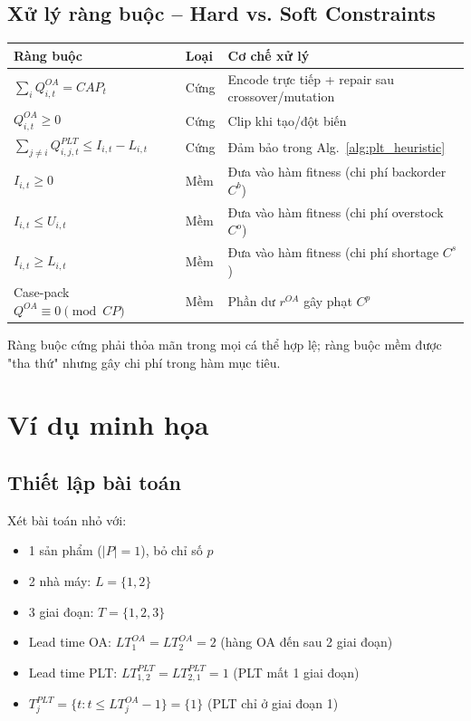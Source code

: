\documentclass[12pt]{article}
\newcommand{\QOA}{Q^{OA}}
\newcommand{\QPLT}{Q^{PLT}}
\begin{document}
\subsection{Xử lý ràng buộc -- Hard vs. Soft Constraints}

\begin{center}
\begin{tabular}{p{}p{}p{}}
\toprule
\textbf{Ràng buộc} & \textbf{Loại} & \textbf{Cơ chế xử lý} \\
\midrule
$\sum_i \QOA_{i,t} = CAP_t$ & Cứng & Encode trực tiếp + repair sau crossover/mutation \\
$\QOA_{i,t} \geq 0$ & Cứng & Clip khi tạo/đột biến \\
$\sum_{j \neq i} \QPLT_{i,j,t} \leq I_{i,t} - L_{i,t}$ & Cứng & Đảm bảo trong Alg.~\ref{alg:plt_heuristic} \\
$I_{i,t} \geq 0$ & Mềm & Đưa vào hàm fitness (chi phí backorder $C^b$) \\
$I_{i,t} \leq U_{i,t}$ & Mềm & Đưa vào hàm fitness (chi phí overstock $C^o$) \\
$I_{i,t} \geq L_{i,t}$ & Mềm & Đưa vào hàm fitness (chi phí shortage $C^s$) \\
Case-pack $\QOA \equiv 0 \pmod{CP}$ & Mềm & Phần dư $r^{OA}$ gây phạt $C^p$ \\
\bottomrule
\end{tabular}
\end{center}

\noindent Ràng buộc cứng phải thỏa mãn trong mọi cá thể hợp lệ; ràng buộc mềm được "tha thứ" nhưng gây chi phí trong hàm mục tiêu.



\section{Ví dụ minh họa}

\subsection{Thiết lập bài toán}

Xét bài toán nhỏ với:
\begin{itemize}
  \item 1 sản phẩm ($|P| = 1$), bỏ chỉ số $p$
  \item 2 nhà máy: $L = \{1, 2\}$
  \item 3 giai đoạn: $T = \{1, 2, 3\}$
  \item Lead time OA: $LT_1^{OA} = LT_2^{OA} = 2$ (hàng OA đến sau 2 giai đoạn)
  \item Lead time PLT: $LT_{1,2}^{PLT} = LT_{2,1}^{PLT} = 1$ (PLT mất 1 giai đoạn)
  \item $T_j^{PLT} = \{t : t \leq LT_j^{OA} - 1\} = \{1\}$ (PLT chỉ ở giai đoạn 1)
\end{itemize}
\end{document}
